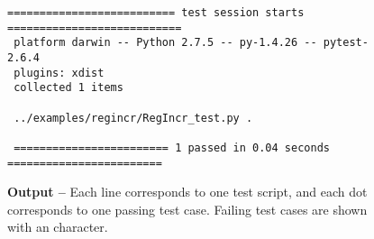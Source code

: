 
\begin{figure}

  \footnotesize
  \begin{Verbatim}[xleftmargin=0.8in]
 ========================== test session starts ===========================
 platform darwin -- Python 2.7.5 -- py-1.4.26 -- pytest-2.6.4
 plugins: xdist
 collected 1 items

 ../examples/regincr/RegIncr_test.py .

 ======================== 1 passed in 0.04 seconds ========================
  \end{Verbatim}
  \vspace{-0.1in}

  \caption{\textbf{ Output --} Each line corresponds to one
    test script, and each dot corresponds to one passing test case.
    Failing test cases are shown with an  character.}
  \label{fig-tut3-pytest-output}

\end{figure}
